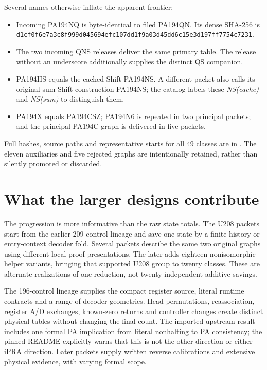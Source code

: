 \documentclass[10pt]{article}
\newcommand{\packet}[1]{\texttt{\detokenize{#1}}}
\begin{document}
Several names otherwise inflate the apparent frontier:
\begin{itemize}
\item Incoming PA194NQ is byte-identical to filed PA194QN. Its dense SHA-256 is
\texttt{d1cf0f6e7a3c8f999d045694efc107dd1f9a03d45dd6c15e3d197ff7754c7231}.
\item The two incoming QNS releases deliver the same primary table. The release
without an underscore additionally supplies the distinct QS companion.
\item PA194HS equals the cached-Shift PA194NS. A different packet also calls
its original-sum-Shift construction PA194NS; the catalog labels these
\emph{NS(cache)} and \emph{NS(sum)} to distinguish them.
\item PA194X equals PA194CSZ; PA194N6 is repeated in two principal packets;
and the principal PA194C graph is delivered in five packets.
\end{itemize}
Full hashes, source paths and representative starts for all 49 classes are in
\packet{frontier194.json}. The eleven auxiliaries and five rejected graphs
are intentionally retained, rather than silently promoted or discarded.

\section{What the larger designs contribute}

The progression is more informative than the raw state totals. The U208
packets start from the earlier 209-control lineage and save one state by a
finite-history or entry-context decoder fold. Several packets describe the
same two original graphs using different local proof presentations. The later
\packet{pa208_research_2026-10-29} adds eighteen nonisomorphic helper variants,
bringing that supported U208 group to twenty classes. These are alternate
realizations of one reduction, not twenty independent additive savings.

The 196-control lineage supplies the compact register source, literal runtime
contracts and a range of decoder geometries. Head permutations, reassociation,
register A/D exchanges, known-zero returns and controller changes create
distinct physical tables without changing the final count. The imported
upstream result includes one formal PA implication from literal nonhalting to
PA consistency; the pinned README explicitly warns that this is not the other
direction or either iPRA direction. Later packets supply written reverse
calibrations and extensive physical evidence, with varying formal scope.
\end{document}
